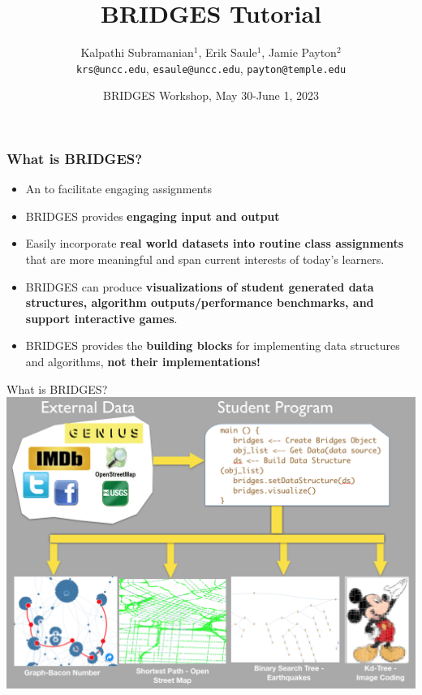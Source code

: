 \documentclass[aspectratio=169]{beamer}
\title{BRIDGES Tutorial}
\subtitle{}
\author{Kalpathi Subramanian$^1$, Erik Saule$^1$, Jamie Payton$^2$\\\texttt{krs@uncc.edu}, \texttt{esaule@uncc.edu}, \texttt{payton@temple.edu} }
\institute{$^1$The University of North Carolina at Charlotte\\$^2$Temple University}
\date{BRIDGES Workshop, May 30-June 1, 2023}
\begin{document}
\begin{frame}
\titlepage
\end{frame}



\begin{frame}
  \frametitle{What is BRIDGES?}
\begin{itemize}
	\item An  to facilitate engaging assignments
	\item BRIDGES provides \textbf{engaging input and output}
	\item Easily incorporate \textbf{real world datasets into routine
		class assignments} that are more meaningful and span
		current interests of today's learners.
	\item BRIDGES can produce \textbf{visualizations of student generated
		data structures, algorithm outputs/performance benchmarks, 
		and support interactive games}.
	\item BRIDGES provides the \textbf{building blocks} for implementing
		data structures and algorithms,  \textbf{not their implementations!}
\end{itemize}
\end{frame}
\begin{frame}{What is BRIDGES?}
  \center\includegraphics[width=.7\linewidth]{fig/bridges-overview.png}
\end{frame}
\end{document}
